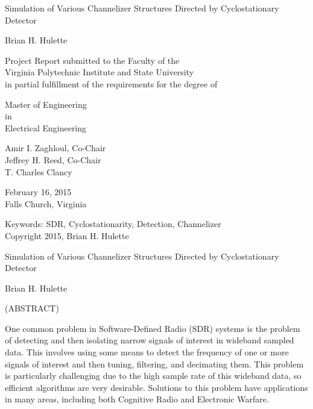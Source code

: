\documentclass[12pt]{report}
\begin{document}
\newcommand{\fourier}{\mathcal{F}}

\thispagestyle{empty}
\begin{center}

{\large
Simulation of Various Channelizer Structures 
Directed by Cyclostationary Detector}

\vfill

Brian H. Hulette

\vfill

Project Report submitted to the Faculty of the \\
Virginia Polytechnic Institute and State University \\
in partial fulfillment of the requirements for the degree of

\vfill

Master of Engineering \\
in \\
Electrical Engineering

\vfill

Amir I. Zaghloul, Co-Chair \\
Jeffrey H. Reed, Co-Chair \\
T. Charles Clancy

\vfill

February 16, 2015 \\
Falls Church, Virginia

\vfill

Keywords: SDR, Cyclostationarity, Detection, Channelizer
\\
Copyright 2015, Brian H. Hulette

\end{center}

\pagebreak

\thispagestyle{empty}
\begin{center}

{\large Simulation of Various Channelizer Structures 
Directed by Cyclostationary Detector}

\vfill

Brian H. Hulette

\vfill

(ABSTRACT)

\vfill

\end{center}

One common problem in Software-Defined Radio (SDR) systems is the problem of
detecting and then isolating narrow signals of interest in wideband sampled
data. This involves using some means to detect the frequency of one or more
signals of interest and then tuning, filtering, and decimating them. This
problem is particularly challenging due to the high sample rate of this
wideband data, so efficient algorithms are very desirable. Solutions to this
problem have applications in many areas, including both Cognitive Radio and
Electronic Warfare.
\end{document}
